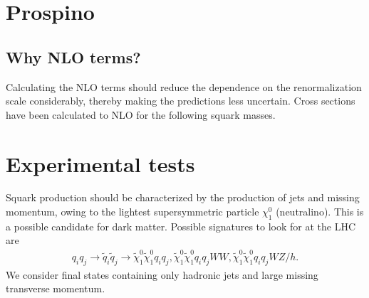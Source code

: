 \documentclass[11pt]{article}
\begin{document}
\pagebreak

\section{Prospino}
\subsection*{Why NLO terms?}
\begin{flushleft}
Calculating the NLO terms should reduce the dependence on the renormalization scale considerably, thereby making the predictions less uncertain. Cross sections have been calculated to NLO for the following squark masses.
\end{flushleft}

\section{Experimental tests}
\begin{flushleft}
Squark production should be characterized by the production of jets and missing momentum, owing to the lightest supersymmetric particle $\chi_1^0$ (neutralino). This is a possible candidate for dark matter. Possible signatures to look for at the LHC are
\begin{align*}
q_iq_j \rightarrow \tilde{q}_i \tilde{q}_j \rightarrow \tilde{\chi}_1^0 \tilde{\chi}_1^0 q_i q_j, \tilde{\chi}_1^0 \tilde{\chi}_1^0 q_i q_j WW, \tilde{\chi}_1^0 \tilde{\chi}_1^0 q_i q_j W Z/h.
\end{align*}
We consider final states containing only hadronic jets and large missing transverse momentum.
\begin{figure}[H]
\centering
{}
\end{figure}
\end{flushleft}




\end{document}
